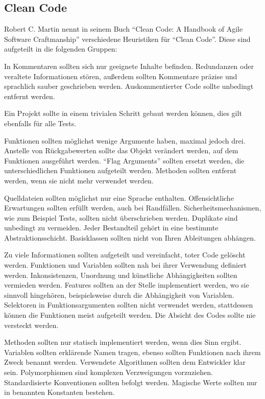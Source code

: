 \newpage

\subsection{Clean Code}
Robert C. Martin nennt in seinem Buch \enquote{Clean Code: A Handbook of Agile Software Craftmanship}\cite{clean-code} verschiedene Heuristiken für \enquote{Clean Code}.
Diese sind aufgeteilt in die folgenden Gruppen:

In Kommentaren sollten sich nur geeignete Inhalte befinden.
Redundanzen oder veraltete Informationen stören, außerdem sollten Kommentare präzise und sprachlich sauber geschrieben werden.
Auskommentierter Code sollte unbedingt entfernt werden.

Ein Projekt sollte in einem trivialen Schritt gebaut werden können, dies gilt ebenfalls für alle Tests.

Funktionen sollten möglichst wenige Argumente haben, maximal jedoch drei.
Anstelle von Rückgabewerten sollte das Objekt verändert werden, auf dem Funktionen ausgeführt werden.
\enquote{Flag Arguments} sollten ersetzt werden, die unterschiedlichen Funktionen aufgeteilt werden.
Methoden sollten entfernt werden, wenn sie nicht mehr verwendet werden.

Quelldateien sollten möglichst nur eine Sprache enthalten.
Offensichtliche Erwartungen sollten erfüllt werden, auch bei Randfällen.
Sicherheitsmechanismen, wie zum Beispiel Tests, sollten nicht überschrieben werden.
Duplikate sind unbedingt zu vermeiden.
Jeder Bestandteil gehört in eine bestimmte Abstraktionsschicht.
Basisklassen sollten nicht von Ihren Ableitungen abhängen.

Zu viele Informationen sollten aufgeteilt und vereinfacht, toter Code gelöscht werden.
Funktionen und Variablen sollten nah bei ihrer Verwendung definiert werden.
Inkonsistenzen, Unordnung und künstliche Abhängigkeiten sollten vermieden werden.
Features sollten an der Stelle implementiert werden, wo sie sinnvoll hingehören, beispielsweise durch die Abhängigkeit von Variablen.
Selektoren in Funktionsargumenten sollten nicht verwendet werden, stattdessen können die Funktionen meist aufgeteilt werden.
Die Absicht des Codes sollte nie versteckt werden.

Methoden sollten nur statisch implementiert werden, wenn dies Sinn ergibt.
Variablen sollten erklärende Namen tragen, ebenso sollten Funktionen nach ihrem Zweck benannt werden.
Verwendete Algorithmen sollten dem Entwickler klar sein.
Polymorphismen sind komplexen Verzweigungen vorzuziehen.
Standardisierte Konventionen sollten befolgt werden.
Magische Werte sollten nur in benannten Konstanten bestehen.

